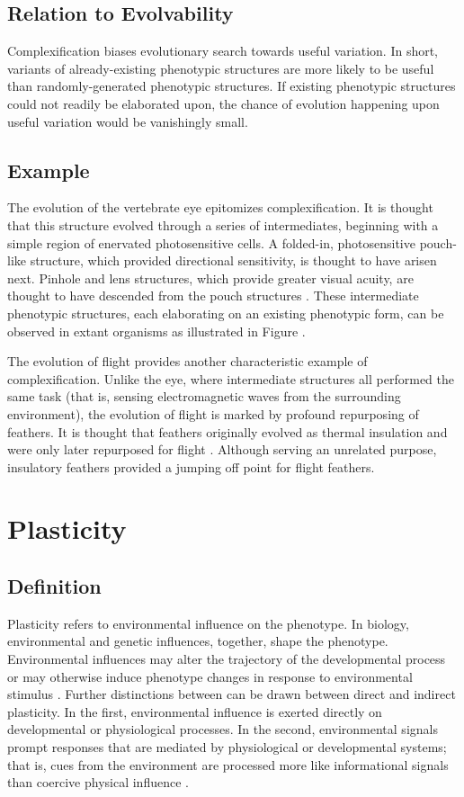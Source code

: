 \subsection{Relation to Evolvability}
Complexification biases evolutionary search towards useful variation. In short, variants of already-existing phenotypic structures are more likely to be useful than randomly-generated phenotypic structures.\mindmapmark{\usefulvariationcomplexification} If existing phenotypic structures could not readily be elaborated upon, the chance of evolution happening upon useful variation would be vanishingly small.

\subsection{Example}
The evolution of the vertebrate eye epitomizes complexification. It is thought that this structure evolved through a series of intermediates, beginning with a simple region of enervated photosensitive cells. A folded-in,  photosensitive pouch-like structure, which provided directional sensitivity, is thought to have arisen next. Pinhole and lens structures, which provide greater visual acuity, are thought to have descended from the pouch structures \cite{Gregory2008TheOrgans}. These intermediate phenotypic structures, each elaborating on an existing phenotypic form, can be observed in extant organisms as illustrated in Figure .

The evolution of flight provides another characteristic example of complexification. Unlike the eye, where intermediate structures all performed the same task (that is, sensing electromagnetic waves from the surrounding environment), the evolution of flight is marked by profound repurposing of feathers. It is thought that feathers originally evolved as thermal insulation and were only later repurposed for flight \cite{Gould1982Exaptation-aForm}. Although serving an unrelated purpose, insulatory feathers provided a jumping off point for flight feathers.

\section{Plasticity} \label{sec:plasticity}
\subsection{Definition}
Plasticity refers to environmental influence on the phenotype. In biology, environmental and genetic influences, together, shape the phenotype. Environmental influences may alter the trajectory of the developmental process or may otherwise induce phenotype changes in response to environmental stimulus \cite{Fusco2010PhenotypicConcepts}. Further distinctions between can be drawn between direct and indirect plasticity. In the first, environmental influence is exerted directly on developmental or physiological processes. In the second, environmental signals prompt responses that are mediated by physiological or developmental systems; that is, cues from the environment are processed more like informational signals than coercive physical influence \cite{Fusco2010PhenotypicConcepts}.

